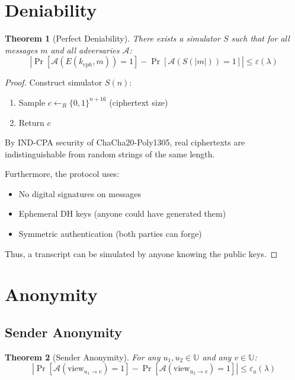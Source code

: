 \documentclass[11pt,a4paper]{article}
\newtheorem{theorem}{Theorem}[section]
\begin{document}
\section{Deniability}

\begin{theorem}[Perfect Deniability]
There exists a simulator $S$ such that for all messages $m$ and all adversaries $\mathcal{A}$:
$$\left| \Pr[\mathcal{A}(E(k_{eph}, m)) = 1] - \Pr[\mathcal{A}(S(|m|)) = 1] \right| \leq \varepsilon(\lambda)$$
\end{theorem}

\begin{proof}
Construct simulator $S(n)$:
\begin{enumerate}
    \item Sample $c \leftarrow_R \{0,1\}^{n + 16}$ (ciphertext size)
    \item Return $c$
\end{enumerate}

By IND-CPA security of ChaCha20-Poly1305, real ciphertexts are indistinguishable from random strings of the same length.

Furthermore, the protocol uses:
\begin{itemize}
    \item No digital signatures on messages
    \item Ephemeral DH keys (anyone could have generated them)
    \item Symmetric authentication (both parties can forge)
\end{itemize}

Thus, a transcript can be simulated by anyone knowing the public keys.
\end{proof}

\section{Anonymity}

\subsection{Sender Anonymity}

\begin{theorem}[Sender Anonymity]
For any $u_1, u_2 \in \mathbb{U}$ and any $v \in \mathbb{U}$:
$$\left| \Pr[\mathcal{A}(\text{view}_{u_1 \rightarrow v}) = 1] - \Pr[\mathcal{A}(\text{view}_{u_2 \rightarrow v}) = 1] \right| \leq \varepsilon_a(\lambda)$$
\end{theorem}
\end{document}
